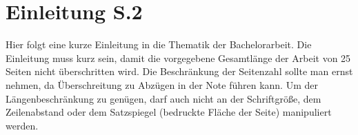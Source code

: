 \chapter{Einleitung S.2}
Hier folgt eine kurze Einleitung in die Thematik der Bachelorarbeit.
Die Einleitung muss kurz sein, damit die vorgegebene Gesamtlänge der 
Arbeit von 25 Seiten nicht überschritten wird. 
Die Beschränkung der Seitenzahl sollte man ernst nehmen,
da Überschreitung zu Abzügen in der Note führen kann. 
Um der Längenbeschränkung zu genügen, darf auch nicht an der Schriftgröße,
dem Zeilenabstand oder dem Satzspiegel (bedruckte Fläche der Seite) manipuliert werden.
